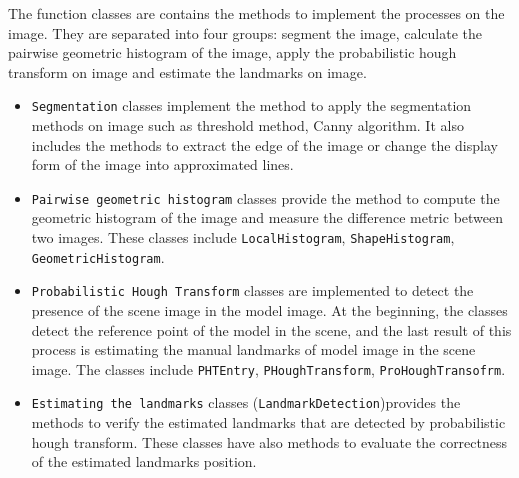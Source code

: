 The function classes are contains the methods to implement the processes on the image. They are separated into four groups: segment the image, calculate the pairwise geometric histogram of the image, apply the probabilistic hough transform on image and estimate the landmarks on image.
\begin{itemize}
	\item \texttt{Segmentation} classes implement the method to apply the segmentation methods on image such as threshold method, Canny algorithm. It also includes the methods to extract the edge of the image or change the display form of the image into approximated lines.
	\item \texttt{Pairwise geometric histogram} classes provide the method to compute the geometric histogram of the image and measure the difference metric between two images. These classes include \texttt{LocalHistogram}, \texttt{ShapeHistogram}, \texttt{GeometricHistogram}.
	\item \texttt{Probabilistic Hough Transform} classes are implemented to detect the presence of the scene image in the model image. At the beginning, the classes detect the reference point of the model in the scene, and the last result of this process is estimating the manual landmarks of model image in the scene image. The classes include \texttt{PHTEntry}, \texttt{PHoughTransform}, \texttt{ProHoughTransofrm}.
	\item \texttt{Estimating the landmarks} classes (\texttt{LandmarkDetection})provides the methods to verify the estimated landmarks that are detected by probabilistic hough transform. These classes have also methods to evaluate the correctness of the estimated landmarks position.
\end{itemize}
